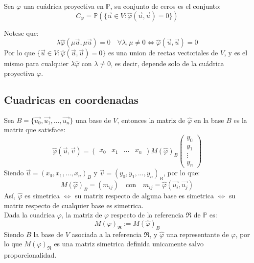 \begin{definición}
    Sea $\varphi$ una cuádrica proyectiva en $\mathbb{P}$, su conjunto de ceros es el conjunto:
    \[
    C_\varphi = 
    \mathbb{P} ( \{ \vec{u} \in V : \hat{\varphi} (\vec{u}, \vec{u}) = 0 \} )
    \]
\end{definición}

\begin{observación}
    Notese que:
    \[
    \lambda \hat{\varphi}(\mu \vec{u}, \mu \vec{u}) = 0 \quad 
    \forall \lambda, \mu \neq 0 \iff
    \hat{\varphi}(\vec{u}, \vec{u}) = 0
    \]
    Por lo que $\{ \vec{u} \in V : \hat{\varphi} (\vec{u}, \vec{u}) = 0 \}$ es una union de rectas vectoriales de $V$, y es el mismo para cualquier $\lambda \hat{\varphi}$ con $\lambda \neq 0$, es decir, depende solo de la cuádrica proyectiva $\varphi$.
\end{observación}

\subsection{Cuadricas en coordenadas}

Sea $B = \{ \vec{u_0}, \vec{u_1}, \ldots , \vec{u_n} \}$ una base de $V$, entonces la matriz de $\hat{\varphi}$ en la base $B$ es la matriz que satisface:
\[
    \hat{\varphi}(\vec{u}, \vec{v}) =
    \begin{pmatrix}
        x_0 & x_1 & \ldots & x_n
    \end{pmatrix}
    M(\hat{\varphi})_B
    \begin{pmatrix}
        y_0 \\ y_1 \\ \vdots \\ y_n
    \end{pmatrix}
\]
Siendo $\vec{u} = (x_0, x_1, \ldots , x_n)_B$ y $\vec{v} = (y_0, y_1, \ldots , y_n)_B$, por lo que:
\[
    M(\hat{\varphi})_B = (m_{ij}) \quad \text{con} \quad
    m_{ij} = \hat{\varphi}(\vec{u_i}, \vec{u_j})
\]
Así, $\hat{\varphi}$ es simetrica $\iff$ su matriz respecto de alguna base es simetrica $\iff$ su matriz respecto de cualquier base es simetrica.\\

Dada la cuadrica $\varphi$, la matriz de $\varphi$ respecto de la referencia $\mathfrak{R}$ de $\mathbb{P}$ es:
\[
    M(\varphi)_{\mathfrak{R}} :=
    M(\hat{\varphi})_B
\]
Siendo $B$ la base de $V$ asociada a la referencia $\mathfrak{R}$, y $\hat{\varphi}$ una representante de $\varphi$, por lo que $M(\varphi)_{\mathfrak{R}}$ es una matriz simetrica definida unicamente salvo proporcionalidad.\\

